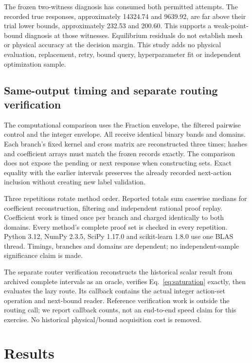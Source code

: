 \documentclass[]{interact}
\begin{document}
The frozen two-witness diagnosis has consumed both permitted attempts. The recorded true responses, approximately 14324.74 and 9639.92, are far above their trial lower bounds, approximately 232.53 and 200.60. This supports a weak-point-bound diagnosis at those witnesses. Equilibrium residuals do not establish mesh or physical accuracy at the decision margin. This study adds no physical evaluation, replacement, retry, bound query, hyperparameter fit or independent optimization sample.

\subsection{Same-output timing and separate routing verification}

The computational comparison uses the Fraction envelope, the filtered pairwise control and the integer envelope. All receive identical binary bands and domains. Each branch's fixed kernel and cross matrix are reconstructed three times; hashes and coefficient arrays must match the frozen records exactly. The comparison does not expose the pending or next response when constructing sets. Exact equality with the earlier intervals preserves the already recorded next-action inclusion without creating new label validation.

Three repetitions rotate method order. Reported totals sum casewise medians for coefficient reconstruction, filtering and independent rational proof replay. Coefficient work is timed once per branch and charged identically to both domains. Every method's complete proof set is checked in every repetition. Python 3.12, NumPy 2.3.5, SciPy 1.17.0 and scikit-learn 1.8.0 use one BLAS thread. Timings, branches and domains are dependent; no independent-sample significance claim is made.

The separate router verification reconstructs the historical scalar result from archived complete intervals as an oracle, verifies Eq.~\eqref{eq:saturation} exactly, then evaluates the lazy route. Its callback contains the actual integer action-set operation and next-bound reader. Reference verification work is outside the routing call; we report callback counts, not an end-to-end speed claim for this exercise. No historical physical/bound acquisition cost is removed.

\section{Results}
\end{document}
